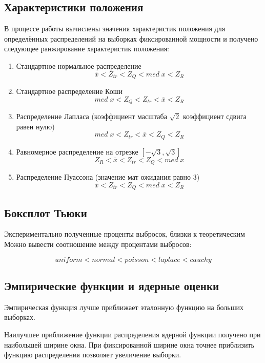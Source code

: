 \documentclass[a4]{article}
\begin{document}
\subsection{Характеристики положения}
\par В процессе работы вычислены значения характеристик положения для определённых распределений на выборках фиксированной мощности и получено следующее ранжирование характеристик положения:

\begin{enumerate}
    \item Стандартное нормальное распределение $$\overline{x} < Z_{tr} < Z_Q < med\;x < Z_R$$
    
    \item Стандартное распределение Коши $$med\;x < Z_Q < Z_{tr} < \overline{x} < Z_R$$
    
    \item Распределение Лапласа (коэффициент масштаба $\sqrt{2}$ коэффициент сдвига равен нулю) $$med\;x < Z_{tr} < \overline{x} < Z_Q < Z_R$$
    
    \item Равномерное распределение на отрезке $\left[-\sqrt{3},\sqrt{3}\right]$ $$Z_R < \overline{x} < Z_{tr} < Z_Q < med\;x$$
    
    \item Распределение Пуассона (значение мат ожидания равно $3$) $$\overline{x} < Z_{tr} < Z_Q < med\;x < Z_R$$
    
\end{enumerate}

\subsection{Боксплот Тьюки}
\par Экспериментально полученные проценты выбросок, близки к теоретическим
Можно вывести соотношение между процентами выбросов:

\begin{equation}
uniform<normal<poisson<laplace<cauchy
\end{equation}

\subsection{Эмпирические функции и ядерные оценки}
Эмпирическая функция лучше приближает эталонную функцию на больших выборках.

Наилучшее приближение функции распределения ядерной функции получено при наибольшей ширине окна. При фиксированной ширине окна точнее приблизить функцию распределения позволяет увеличение выборки.
\end{document}
